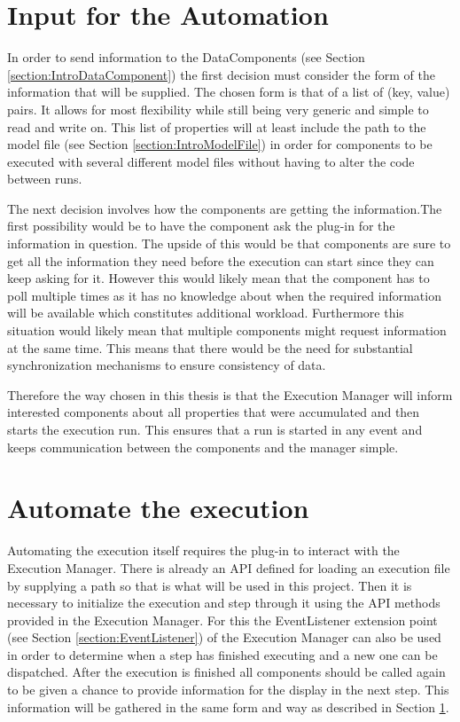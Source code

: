 \section{Input for the Automation}
\label{section:AutoConceptsInput}
In order to send information to the DataComponents (see Section \ref{section:IntroDataComponent})
the first decision must consider the form of the information that will be supplied.
The chosen form is that of a list of (key, value) pairs. It allows for most
flexibility while still being very generic and simple to read and write on.
This list of properties will at least include the path to the model file (see Section \ref{section:IntroModelFile}) in order
for components to be executed with several different model files without having
to alter the code between runs.

The next decision involves how the components are getting the information.The first possibility 
would be to have the component ask the plug-in for the information
in question. The upside of this would be that components are sure to get all the information
they need before the execution can start since they can keep asking for it. However this would
likely mean that the component has to poll multiple times as it has no knowledge about when
the required information will be available which constitutes additional workload. Furthermore
this situation would likely mean that multiple components might request information
at the same time. This means that there would be the need for substantial synchronization mechanisms
to ensure consistency of data.

Therefore the way chosen in this thesis is that the Execution Manager will inform interested components
about all properties that were accumulated and then starts the execution run. This ensures
that a run is started in any event and keeps communication between the components and the manager simple.

\section{Automate the execution}
\label{section:AutoConceptsExecution}
Automating the execution itself requires the plug-in to interact with the Execution Manager.
There is already an \ac{API} defined for loading an execution file by supplying a path so that
is what will be used in this project.
Then it is necessary to initialize the execution and step through it using the \ac{API}
methods provided in the Execution Manager. For this the EventListener extension point (see Section \ref{section:EventListener}) of the 
Execution Manager can also be used in order to determine when a step has finished executing and
a new one can be dispatched.
After the execution is finished all components should be called again to be given
a chance to provide information for the display in the next step. This information
will be gathered in the same form and way as described in Section \ref{section:AutoConceptsInput}.


